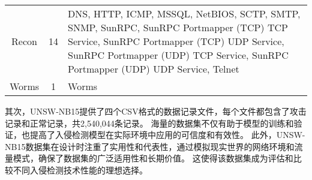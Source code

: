 \begin{table}[htbp]
\begin{tabularx}{\textwidth}{@{}ccX@{}}
		Recon                             & 14                                & DNS, HTTP, ICMP, MSSQL, NetBIOS, SCTP, SMTP, SNMP, SunRPC, SunRPC Portmapper (TCP) TCP Service, SunRPC Portmapper (TCP) UDP Service, SunRPC Portmapper (UDP) TCP Service, SunRPC Portmapper (UDP) UDP Service, Telnet                                                                                                                                                                                                                                                                                                                                               \\
		Worms                             & 1                                 & Worms                                                                                                                                                                                                                                                                                                                                                                                                                                                                                                                                                               \\
		\bottomrule
	\end{tabularx}
\end{table}\par

其次，UNSW-NB15提供了四个CSV格式的数据记录文件，每个文件都包含了攻击记录和正常记录，共2,540,044条记录。
海量的数据集不仅有助于模型的训练和验证，也提高了入侵检测模型在实际环境中应用的可信度和有效性。
此外，UNSW-NB15数据集在设计时注重了实用性和代表性，通过模拟现实世界的网络环境和流量模式，确保了数据集的广泛适用性和长期价值。
这使得该数据集成为评估和比较不同入侵检测技术性能的理想选择。\par

